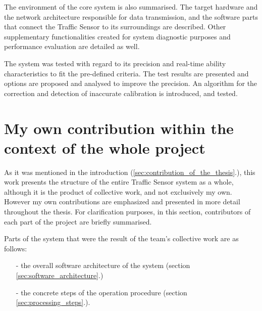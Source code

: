 The environment of the core system is also summarised.
The target hardware and the network architecture responsible for data transmission, and the software parts that connect the Traffic Sensor to its surroundings are described.
Other supplementary functionalities created for system diagnostic purposes and performance evaluation are detailed as well.

The system was tested with regard to its precision and real-time ability characteristics to fit the pre-defined criteria.
The test results are presented and options are proposed and analysed to improve the precision.
An algorithm for the correction and detection of inaccurate calibration is introduced, and tested.

\section{My own contribution within the context of the whole project}
As it was mentioned in the introduction (\ref{sec:contribution_of_the_thesis}.), this work presents the structure of the entire Traffic Sensor system as a whole, although it is the product of collective work, and not exclusively my own.
However my own contributions are emphasized and presented in more detail throughout the thesis.
For clarification purposes, in this section, contributors of each part of the project are briefly summarised.

\noindent Parts of the system that were the result of the team's collective work are as follows:
\begin{itemize}
	\item[-] the overall software architecture of the system (section \ref{sec:software_architecture}.)
	\item[-] the concrete steps of the operation procedure (section \ref{sec:processing_steps}.).
\end{itemize}

